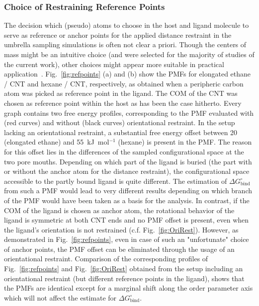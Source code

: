 \documentclass[9pt,lessons,pubversion]{livecoms}
\begin{document}
\subsubsection*{Choice of Restraining Reference Points}
\label{subsec:refpoints}

The decision which (pseudo) atoms to choose in the host and ligand molecule to serve as reference or anchor points for the applied distance restraint in the umbrella sampling simulations is often not clear a priori.
Though the centers of mass might be an intuitive choice (and were selected for the majority of studies of the current work), other choices might appear more suitable in practical application~\cite{doudou2009standard}.
Fig.~\ref{fig:refpoints} (a) and (b) show the PMFs for elongated ethane / CNT and hexane / CNT, respectively, as obtained when a peripheric carbon atom was picked as reference point in the ligand.
The COM of the CNT was chosen as reference point within the host as has been the case hitherto.  
Every graph contains two free energy profiles, corresponding to the PMF evaluated with (red curves) and without (black curves) orientational restraint.
In the setup lacking an orientational restraint, a substantial free energy offset between 20 (elongated ethane) and 55~kJ~mol$^{-1}$ (hexane) is present in the PMF.
The reason for this offset lies in the differences of the sampled configurational space at the two pore mouths. 
Depending on which part of the ligand is buried (the part with or without the anchor atom for the distance restraint), the configurational space accessible to the partly bound ligand is quite different. 
The estimation of  $\Delta G^\circ_\mathrm{bind}$ from such a PMF would lead to very different results depending on which branch of the PMF would have been taken as a basis for the analysis.
In contrast, if the COM of the ligand is chosen as anchor atom, the rotational behavior of the ligand is symmetric at both CNT ends and no PMF offset is present, even when the ligand's orientation is not restrained 
(c.f. Fig.~\ref{fig:OriRest}). 
However, as demonstrated in Fig.~\ref{fig:refpoints}, even in case of such an "unfortunate" choice of anchor points, the PMF offset can be eliminated through the usage of an orientational restraint.
Comparison of the corresponding profiles of Fig.~\ref{fig:refpoints} and Fig.~\ref{fig:OriRest} obtained from the setup including an orientational restraint (but different reference points in the ligand), 
shows that the PMFs are identical except for a marginal shift along the order parameter axis which will not affect the estimate for $\Delta G^\circ_\mathrm{bind}$.
\end{document}
